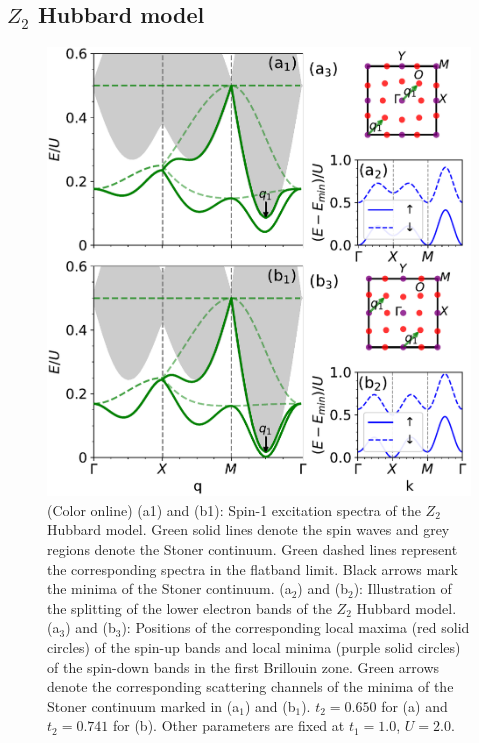 \documentclass[amsmath,superscriptaddress,showpacs,aps,prb,twocolumn]{revtex4-1}
\begin{document}
\subsection{$Z_2$ Hubbard model}\label{ZHM}
\begin{figure}
\includegraphics[width=\columnwidth]{tispectrum}
\caption{(Color online) (a1) and (b1): Spin-1 excitation spectra of the $Z_2$ Hubbard model. Green solid lines denote the spin waves and grey regions denote the Stoner continuum. Green dashed lines represent the corresponding spectra in the flatband limit. Black arrows mark the minima of the Stoner continuum. (a$_2$) and (b$_2$): Illustration of the splitting of the lower electron bands of the $Z_2$ Hubbard model. (a$_3$) and (b$_3$): Positions of the corresponding local maxima (red solid circles) of the spin-up bands and local minima (purple solid circles) of the spin-down bands in the first Brillouin zone. Green arrows denote the corresponding scattering channels of the minima of the Stoner continuum marked in (a$_1$) and (b$_1$). $t_2=0.650$ for (a) and $t_2=0.741$ for (b). Other parameters are fixed at $t_1=1.0$, $U=2.0$.}
\label{tispectrum}
\end{figure}
\end{document}
